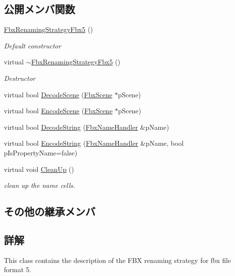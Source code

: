 \subsection*{公開メンバ関数}
\begin{DoxyCompactItemize}
\item 
\hyperlink{class_fbx_renaming_strategy_fbx5_a4495cfe87ae05a9bc3e8d50858ab46d0}{Fbx\+Renaming\+Strategy\+Fbx5} ()
\begin{DoxyCompactList}\small\item\em Default constructor \end{DoxyCompactList}\item 
virtual \hyperlink{class_fbx_renaming_strategy_fbx5_a3c6e6645362d6a0042e5458396ae4609}{$\sim$\+Fbx\+Renaming\+Strategy\+Fbx5} ()
\begin{DoxyCompactList}\small\item\em Destructor \end{DoxyCompactList}\item 
virtual bool \hyperlink{class_fbx_renaming_strategy_fbx5_a3af6482297f78deb29a48a9f26ded270}{Decode\+Scene} (\hyperlink{class_fbx_scene}{Fbx\+Scene} $\ast$p\+Scene)
\item 
virtual bool \hyperlink{class_fbx_renaming_strategy_fbx5_a559a5b6e57b4ac39b09aaa13fa021ab9}{Encode\+Scene} (\hyperlink{class_fbx_scene}{Fbx\+Scene} $\ast$p\+Scene)
\item 
virtual bool \hyperlink{class_fbx_renaming_strategy_fbx5_a10862b9d829203cdb2810c2f42c844ee}{Decode\+String} (\hyperlink{class_fbx_name_handler}{Fbx\+Name\+Handler} \&p\+Name)
\item 
virtual bool \hyperlink{class_fbx_renaming_strategy_fbx5_adcd74ccce2269d962b5bd8e8600c472c}{Encode\+String} (\hyperlink{class_fbx_name_handler}{Fbx\+Name\+Handler} \&p\+Name, bool p\+Is\+Property\+Name=false)
\item 
virtual void \hyperlink{class_fbx_renaming_strategy_fbx5_a581d1d5e0b4fcc9f9702be12669fc795}{Clean\+Up} ()
\begin{DoxyCompactList}\small\item\em clean up the name cells. \end{DoxyCompactList}\end{DoxyCompactItemize}
\subsection*{その他の継承メンバ}


\subsection{詳解}
This class contains the description of the F\+BX renaming strategy for fbx file format 5. 

